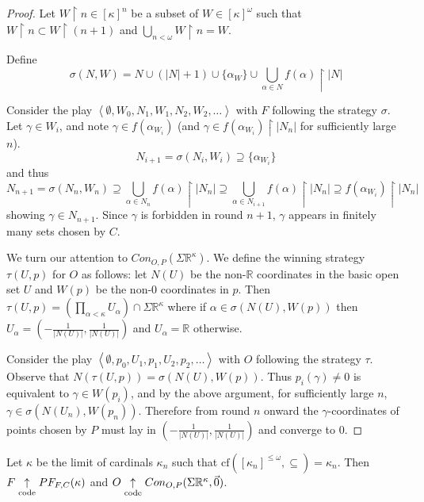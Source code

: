 \begin{proof}
Let $W\restriction n \in [\kappa]^n$ be a subset of $W\in[\kappa]^\omega$ such that $W\restriction n \subset W \restriction (n+1)$ and $\bigcup_{n<\omega} W\restriction n = W$.

Define \[\sigma(N,W) = N \cup (|N|+1) \cup \{\alpha_W\} \cup \bigcup_{\alpha \in N} f(\alpha) \restriction |N|\]

Consider the play $\left<\emptyset,W_0,N_1,W_1,N_2,W_2,\dots\right>$ with $F$ following the strategy $\sigma$. Let $\gamma \in W_i$, and note $\gamma \in f(\alpha_{W_i})$ (and $\gamma \in f(\alpha_{W_i})\restriction |N_n|$ for sufficiently large $n$). \[N_{i+1} = \sigma(N_i,W_i) \supseteq \{\alpha_{W_i}\}\] and thus \[N_{n+1} = \sigma(N_n,W_n) \supseteq \bigcup_{\alpha \in N_n} f(\alpha) \restriction |N_n| \supseteq \bigcup_{\alpha \in N_{i+1}} f(\alpha) \restriction |N_n| \supseteq f(\alpha_{W_i}) \restriction |N_n|\] showing $\gamma \in N_{n+1}$. Since $\gamma$ is forbidden in round $n+1$, $\gamma$ appears in finitely many sets chosen by $C$.

We turn our attention to $Con_{O,P}(\Sigma\mathbb{R}^\kappa)$. We define the winning strategy $\tau(U,p)$ for $O$ as follows: let $N(U)$ be the non-$\mathbb{R}$ coordinates in the basic open set $U$ and $W(p)$ be the non-$0$ coordinates in $p$. Then $\tau(U,p) = \left(\prod_{\alpha<\kappa} U_\alpha\right) \cap \Sigma\mathbb{R}^\kappa$ where if $\alpha \in \sigma(N(U),W(p))$ then $U_\alpha = (-\frac{1}{|N(U)|},\frac{1}{|N(U)|})$ and $U_\alpha=\mathbb{R}$ otherwise.

Consider the play $\left<\emptyset,p_0,U_1,p_1,U_2,p_2,\dots\right>$ with $O$ following the strategy $\tau$. Observe that $N(\tau(U,p))=\sigma(N(U),W(p))$. Thus $p_i(\gamma)\not=0$ is equivalent to $\gamma \in W(p_i)$, and by the above argument, for sufficiently large $n$, $\gamma \in \sigma(N(U_n),W(p_n))$. Therefore from round $n$ onward the $\gamma$-coordinates of points chosen by $P$ must lay in $(-\frac{1}{|N(U)|},\frac{1}{|N(U)|})$ and converge to $0$.
\end{proof}

\begin{thm}
Let $\kappa$ be the limit of cardinals $\kappa_n$ such that $\textrm{cf}([\kappa_n]^{\leq\omega},\subseteq)=\kappa_n$. Then $F \underset{\text{code}}{\uparrow} PF_{F,C}(\kappa)$ and $O \underset{\text{code}}{\uparrow} Con_{O,P}(\Sigma\mathbb{R}^{\kappa},\vec{0})$.
\end{thm}

